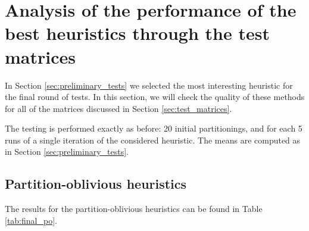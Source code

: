 \section{Analysis of the performance of the best heuristics through the test matrices} \label{sec:final_tests}

In Section \ref{sec:preliminary_tests} we selected the most interesting heuristic for the final round of tests. In this section, we will check the quality of these methods for all of the matrices discussed in Section \ref{sec:test_matrices}.

The testing is performed exactly as before: 20 initial partitionings, and for each 5 runs of a single iteration of the considered heuristic. The means are computed as in Section \ref{sec:preliminary_tests}.

\subsection{Partition-oblivious heuristics}

The results for the partition-oblivious heuristics can be found in Table \ref{tab:final_po}.

